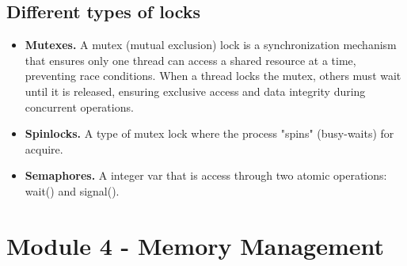 \documentclass{article}
\begin{document}

\subsection{Different types of locks}

\begin{itemize}
    \item {\bf Mutexes.} A mutex (mutual exclusion) lock is a synchronization mechanism that ensures only one thread can 
    access a shared resource at a time, preventing race conditions. 
    When a thread locks the mutex, others must wait until it is released, 
    ensuring exclusive access and data integrity during concurrent operations.
    \item {\bf Spinlocks.} A type of mutex lock where the process "spins" (busy-waits) for acquire. 
    \item {\bf Semaphores.} A integer var that is access through two atomic operations: wait() and signal().
\end{itemize}





\section{Module 4 - Memory Management}
\end{document}
